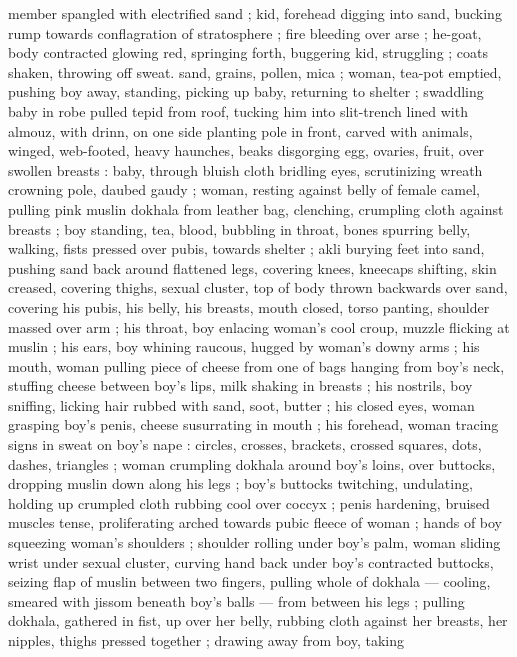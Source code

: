 member spangled with electrified sand ; kid, forehead digging into
sand, bucking rump towards conflagration of stratosphere ; fire
bleeding over arse ; he-goat, body contracted glowing red, springing
forth, buggering kid, struggling ; coats shaken, throwing off sweat.
sand, grains, pollen, mica ; woman, tea-pot emptied, pushing boy
away, standing, picking up baby, returning to shelter ; swaddling
baby in robe pulled tepid from roof, tucking him into slit-trench lined
with almouz, with drinn, on one side planting pole in front, carved
with animals, winged, web-footed, heavy haunches, beaks disgorging
egg, ovaries, fruit, over swollen breasts : baby, through bluish cloth
bridling eyes, scrutinizing wreath crowning pole, daubed gaudy ;
woman, resting against belly of female camel, pulling pink muslin
dokhala from leather bag, clenching, crumpling cloth against breasts
; boy standing, tea, blood, bubbling in throat, bones spurring belly,
walking, fists pressed over pubis, towards shelter ; akli burying feet
into sand, pushing sand back around flattened legs, covering knees,
kneecaps shifting, skin creased, covering thighs, sexual cluster, top
of body thrown backwards over sand, covering his pubis, his belly,
his breasts, mouth closed, torso panting, shoulder massed over arm
; his throat, boy enlacing woman's cool croup, muzzle flicking at
muslin ; his ears, boy whining raucous, hugged by woman's downy
arms ; his mouth, woman pulling piece of cheese from one of bags
hanging from boy's neck, stuffing cheese between boy's lips, milk
shaking in breasts ; his nostrils, boy sniffing, licking hair rubbed with
sand, soot, butter ; his closed eyes, woman grasping boy's penis,
cheese susurrating in mouth ; his forehead, woman tracing signs in
sweat on boy's nape : circles, crosses, brackets, crossed squares,
dots, dashes, triangles ; woman crumpling dokhala around boy's
loins, over buttocks, dropping muslin down along his legs ; boy's
buttocks twitching, undulating, holding up crumpled cloth rubbing
cool over coccyx ; penis hardening, bruised muscles tense,
proliferating arched towards pubic fleece of woman ; hands of boy
squeezing woman's shoulders ; shoulder rolling under boy's palm,
woman sliding wrist under sexual cluster, curving hand back under
boy’s contracted buttocks, seizing flap of muslin between two
fingers, pulling whole of dokhala --- cooling, smeared with jissom
beneath boy's balls --- from between his legs ; pulling dokhala,
gathered in fist, up over her belly, rubbing cloth against her breasts,
her nipples, thighs pressed together ; drawing away from boy, taking
